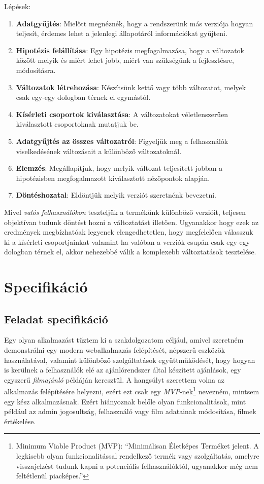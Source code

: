 \documentclass[
]{thesis-ekf}
\theoremstyle{definition}
\theoremstyle{remark}
\begin{document}
Lépések:
\begin{enumerate}
	\item \textbf{Adatgyűjtés}: Mielőtt megnéznék, hogy a rendszerünk más verziója hogyan teljesít, érdemes lehet a jelenlegi állapotáról információkat gyűjteni.
	\item \textbf{Hipotézis felállítása}: Egy hipotézis megfogalmazása, hogy a változatok között melyik és miért lehet jobb, miért van szükségünk a fejlesztésre, módosításra.
	\item \textbf{Változatok létrehozása}: Készítsünk kettő vagy több változatot, melyek csak egy-egy dologban térnek el egymástól.
	\item \textbf{Kísérleti csoportok kiválasztása}: A változatokat véletlenszerűen kiválasztott csoportoknak mutatjuk be.
	\item \textbf{Adatgyűjtés az összes változatról}: Figyeljük meg a felhasználók viselkedésének változásait a különböző változatoknál.
	\item \textbf{Elemzés}: Megállapítjuk, hogy melyik változat teljesített jobban a hipotézisben megfogalmazott kiválasztott nézőpontok alapján.
	\item \textbf{Döntéshozatal}: Eldöntjük melyik verziót szeretnénk bevezetni.
\end{enumerate}\cite{a/b-testing-guide}

Mivel \emph{valós felhasználókon} teszteljük a termékünk különböző verzióit, teljesen objektívan tudunk döntést hozni a változtatást illetően. Ugyanakkor hogy ezek az eredmények megbízhatóak legyenek elengedhetetlen, hogy megfelelően válasszuk ki a kísérleti csoportjainkat valamint ha valóban a verziók csupán csak egy-egy dologban térnek el, akkor nehezebbé válik a komplexebb változtatások tesztelése.

\chapter{Specifikáció}
\section{Feladat specifikáció}
Egy olyan alkalmazást tűztem ki a szakdolgozatom céljául, amivel szeretném demonstrálni egy modern webalkalmazás felépítését, népszerű eszközök használatával, valamint különböző szolgáltatások együttműködését, hogy hogyan is kerülnek a felhasználók elé az ajánlórendszer által készített ajánlások, egy egyszerű \emph{filmajánló} példáján keresztül. A hangsúlyt szerettem volna az alkalmazás felépítésére helyezni, ezért ezt csak egy \emph{MVP}-nek\footnote{Minimum Viable Product (MVP): ``Minimálisan Életképes Terméket jelent. A legkisebb olyan funkcionalitással rendelkező termék vagy szolgáltatás, amelyre visszajelzést tudunk kapni a potenciális felhasználóktól, ugyanakkor még nem feltétlenül piacképes.''\cite{mvp-es-mme-jelentese}} nevezném, mintsem egy kész alkalmazásnak. Ezért hiányoznak belőle olyan funkcionalitások, mint például az admin jogosultság, felhasználó vagy film adatainak módosítása, filmek értékelése.
\end{document}
